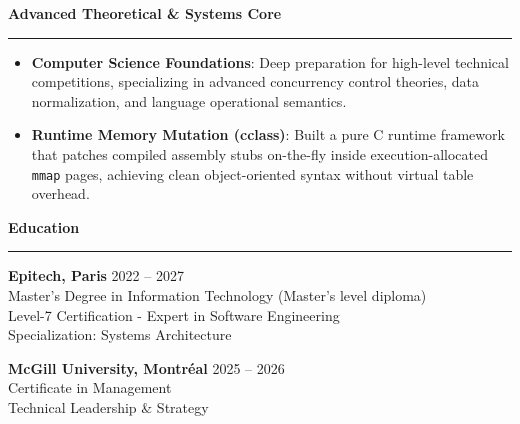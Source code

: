 \documentclass[9pt]{extarticle}
\begin{document}
{\large\bfseries Advanced Theoretical \& Systems Core}
\par\vspace{-8pt}
\rule{\linewidth}{0.4pt}
\par\vspace{5pt}
\begin{itemize}[noitemsep, topsep=0pt]
    \item {\bfseries Computer Science Foundations}: Deep preparation for high-level technical competitions, specializing in advanced concurrency control theories, data normalization, and language operational semantics.
    \item {\bfseries Runtime Memory Mutation (cclass)}: Built a pure C runtime framework that patches compiled assembly stubs on-the-fly inside execution-allocated \texttt{mmap} pages, achieving clean object-oriented syntax without virtual table overhead.
\end{itemize}

\par\vspace{5pt}

{\large\bfseries Education}
\par\vspace{-8pt}
\rule{\linewidth}{0.4pt}
\par\vspace{5pt}

{\bfseries Epitech, Paris} \hfill 2022 -- 2027 \\
Master's Degree in Information Technology (Master's level diploma) \\
Level-7 Certification - Expert in Software Engineering \\
Specialization: Systems Architecture \\

\vspace{4pt}

{\bfseries McGill University, Montréal} \hfill 2025 -- 2026 \\
Certificate in Management \\
Technical Leadership \& Strategy
\end{document}
